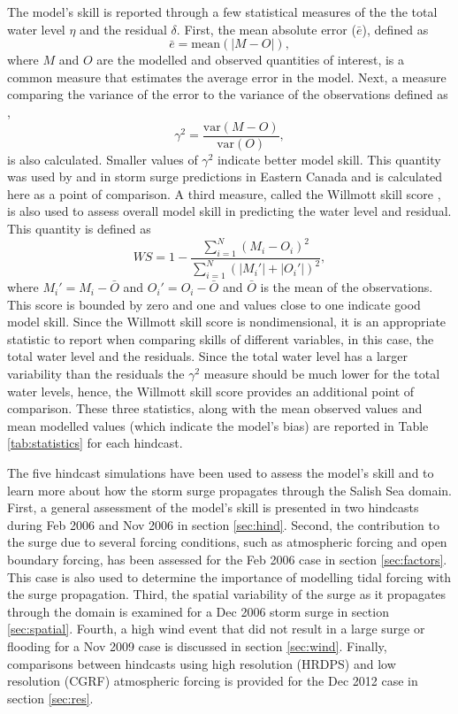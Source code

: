 \documentclass{tATO2e}
\begin{document}
The model's skill is reported through a few statistical measures of the the total water level $\eta$ and the residual $\delta$. First, the mean absolute error ($\bar{e}$), defined as
\begin{equation}
\bar{e} = \text{mean}\left(\left| M - O \right|\right),
\end{equation}
where $M$ and $O$ are the modelled and observed quantities of interest, is a common measure that estimates the average error in the model. Next, a measure comparing the variance of the error to the variance of the observations defined as \citep{thompson2003prediction},
\begin{equation}
\gamma^2 = \frac{\text{var}\left(M-O\right)}{\text{var}\left(O\right)},
\end{equation}
is also calculated. Smaller values of $\gamma^2$ indicate better model skill. This quantity was used by \citet{bernier2006predicting} and \citet{bernier2010tide} in storm surge predictions in Eastern Canada and is calculated here as a point of comparison. A third measure, called the Willmott skill score \citep{willmott1982some}, is also used to assess overall model skill in predicting the water level and residual. This quantity is defined as
\begin{equation}
WS = 1 - \frac{\sum_{i=1}^N \left(M_i - O_i\right)^2}{\sum_{i=1}^N \left(|M_i'| + |O_i'|\right)^2},
\end{equation} 
where $M_i' = M_i-\bar{O}$ and $O_i'=O_i-\bar{O}$ and $\bar{O}$ is the mean of the observations. This score is bounded by zero and one and values close to one indicate good model skill. Since the Willmott skill score is nondimensional, it is an appropriate statistic to report when comparing skills of different variables, in this case, the total water level and the residuals. Since the total water level has a larger variability than the residuals the $\gamma^2$ measure should be much lower for the total water levels, hence, the Willmott skill score provides an additional point of comparison. These three statistics, along with the mean observed values and mean modelled values (which indicate the model's bias) are reported in Table \ref{tab:statistics} for each hindcast.  

The five hindcast simulations have been used to assess the model's skill and to learn more about how the storm surge propagates through the Salish Sea domain.  First, a general assessment of the model's skill is presented in two hindcasts during Feb 2006 and Nov 2006 in section \ref{sec:hind}.  Second, the contribution to the surge due to several forcing conditions, such as atmospheric forcing and open boundary forcing, has been assessed for the Feb 2006 case in section \ref{sec:factors}. This case is also used to determine the importance of modelling tidal forcing with the surge propagation. Third, the spatial variability of the surge as it propagates through the domain is examined for a Dec 2006 storm surge in section \ref{sec:spatial}. Fourth, a high wind event that did not result in a large surge or flooding for a Nov 2009 case is discussed in section \ref{sec:wind}. Finally, comparisons between hindcasts using high resolution (HRDPS) and low resolution (CGRF) atmospheric forcing is provided for the Dec 2012 case in section \ref{sec:res}. 
\end{document}
